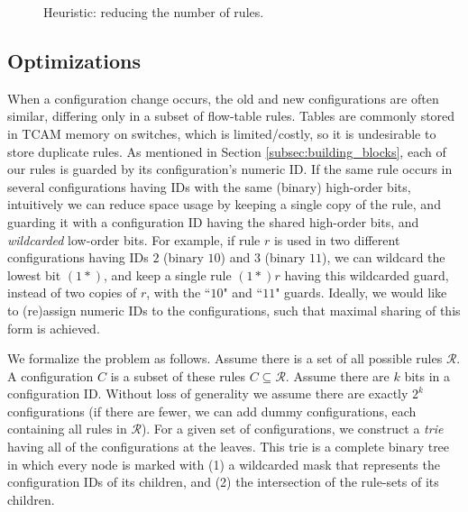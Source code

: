 \documentclass[pldi-cameraready]{sigplanconf}
\begin{document}
\begin{figure}[t]
\footnotesize
{}
\caption{Heuristic: reducing the number of rules.}
\label{fig:heuristic}
\end{figure}

\subsection{Optimizations}
\label{sec:opt}

When a configuration change occurs,
the old and new configurations are often similar, 
differing only in a subset of flow-table rules.
Tables are commonly stored in TCAM memory on switches, which is
limited/costly, so it is undesirable to store duplicate rules. 
As mentioned in Section \ref{subsec:building_blocks}, each
of our rules is guarded by its configuration's numeric ID.
If the same rule occurs in several configurations having
IDs with the same (binary) high-order bits,
intuitively we can reduce space
usage by keeping a single copy of the rule, and guarding it
with a configuration ID having the shared high-order bits, and {\em wildcarded} low-order bits.
For example, if rule $r$ is used in two different 
configurations having IDs $2$ (binary $10$) and $3$ (binary $11$), 
we can wildcard the lowest bit $(1*)$, and keep a single rule $(1*)r$ having this wildcarded
guard, instead of two copies of $r$, with the ``$10$" and ``$11$" guards.
Ideally, we would like to (re)assign numeric IDs to the configurations, such
that maximal sharing of this form is achieved.


We formalize the problem as follows. 
Assume there is a set of all possible rules ${\mathcal R}$.
A configuration $C$ is a subset of these rules $C\subseteq {\mathcal R}$.
Assume there are $k$ bits in a configuration ID.
Without loss of generality we assume there are exactly $2^k$ configurations 
(if there are fewer, we can add dummy configurations, each containing all rules in ${\mathcal R}$). 
For a given set of configurations, we construct a \emph{trie} having all
of the configurations at the leaves.
This trie is a complete binary tree in which every node is marked 
with (1) a wildcarded mask that represents the configuration IDs of its children,
and (2) the intersection of the rule-sets of its children.
\end{document}
